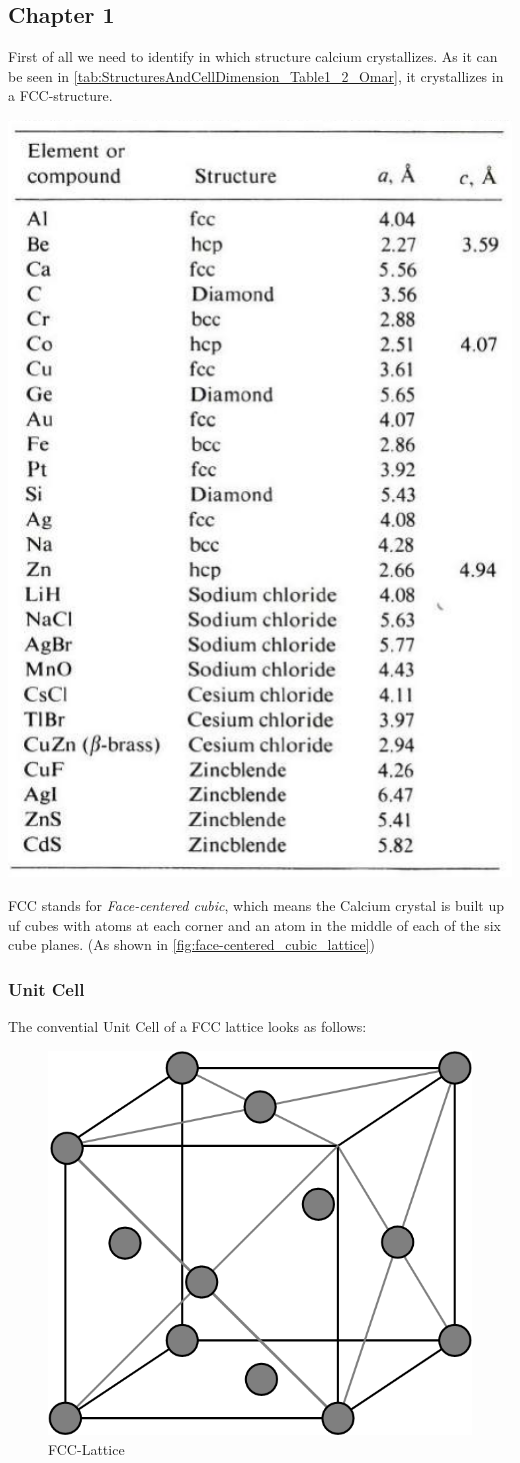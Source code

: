 \subsection{Chapter 1}

First of all we need to identify in which structure calcium crystallizes.
As it can be seen in \autoref{tab:StructuresAndCellDimension_Table1_2_Omar},
it crystallizes in a FCC-structure.

\begin{table}[H]
	\centering
	\caption{Structures and Cell Dimensions of some Elements and Compounds\\
	Elementary Solid State Physics \cite{elementary_SSP}, p. 18}
	\includegraphics[width=0.5\linewidth]{Graphics/Chapter1/StructuresAndCellDimension_Table1_2_Omar}
	\label{tab:StructuresAndCellDimension_Table1_2_Omar}
\end{table}

FCC stands for \textit{Face-centered cubic}, which means 
the Calcium crystal is built up uf cubes with atoms at each
corner and an atom in the middle of each of the six cube planes.
(As shown in \autoref{fig:face-centered_cubic_lattice})

\subsubsection*{Unit Cell}
The convential Unit Cell of a FCC lattice looks as follows:

\begin{figure}[H]
	\centering
	\includegraphics[width=0.4\linewidth]{Graphics/Chapter1/face-centered_cubic_lattice.png}
	\caption{FCC-Lattice}
	\label{fig:face-centered_cubic_lattice}
\end{figure}


